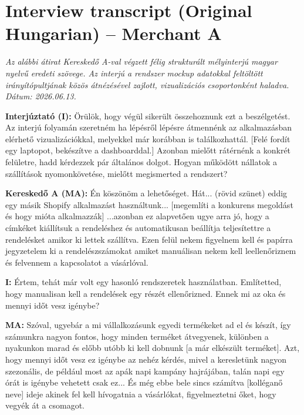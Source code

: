 \documentclass{imc-inf}
\begin{document}
\begin{appendices}
  \label{app:qualitative-interviews}

  \chapter{Interview transcript (Original Hungarian) -- Merchant A}
  \label{app:interview-merchant-a}

  \noindent\textit{Az alábbi átirat Kereskedő A-val végzett félig strukturált mélyinterjú magyar nyelvű eredeti szövege. Az interjú a rendszer mockup adatokkal feltöltött irányítópultjának közös átnézésével zajlott, vizualizációs csoportonként haladva. Dátum: 2026.06.13.}

  \bigskip
  \noindent\textbf{Interjúztató (I):} Örülök, hogy végül sikerült összehoznunk ezt a beszélgetést. Az interjú folyamán szeretném ha lépésről lépésre átmennénk az alkalmazásban elérhető vizualizációkkal, melyekkel már korábban is találkozhattál. [Felé fordít egy laptopot, bekészítve a dashboarddal.] Azonban mielőtt rátérnénk a konkrét felületre, hadd kérdezzek pár általános dolgot. Hogyan működött nállatok a szállítások nyomonkövetése, mielőtt megismerted a rendszert?

  \noindent\textbf{Kereskedő A (MA):} Én köszönöm a lehetőséget. Hát... (rövid szünet) eddig egy másik Shopify alkalmazást használtunk... [megemlíti a konkurens megoldást és hogy mióta alkalmazzák] ...azonban ez alapvetően ugye arra jó, hogy a címkéket kiállítsuk a rendeléshez és automatikusan beállítja teljesítettre a rendelésket amikor ki lettek szállítva. Ezen felül nekem figyelnem kell és papírra jegyzetelem ki a rendelészszámokat amiket manuálisan nekem kell leellenőriznem és felvennem a kapcsolatot a vásárlóval.

  \noindent\textbf{I:} Értem, tehát már volt egy hasonló rendszeretek használatban. Említetted, hogy manualisan kell a rendelések egy részét ellenőrizned. Ennek mi az oka és mennyi időt vesz igénybe?

  \noindent\textbf{MA:} Szóval, ugyebár a mi vállalkozásunk egyedi termékeket ad el és készít, így számunkra nagyon fontos, hogy minden terméket átvegyenek, különben a nyakunkon marad és előbb utóbb ki kell dobnunk [a már elkészült terméket]. Azt, hogy mennyi időt vesz ez igénybe az nehéz kérdés, mivel a keresletünk nagyon szezonális, de például most az apák napi kampány hajrájában, talán napi egy órát is igénybe vehetett csak ez... És még ebbe bele sincs számítva [kolléganő neve] ideje akinek fel kell hívogatnia a vásárlókat, figyelmeztetni őket, hogy vegyék át a csomagot.


\end{appendices}
\end{document}
